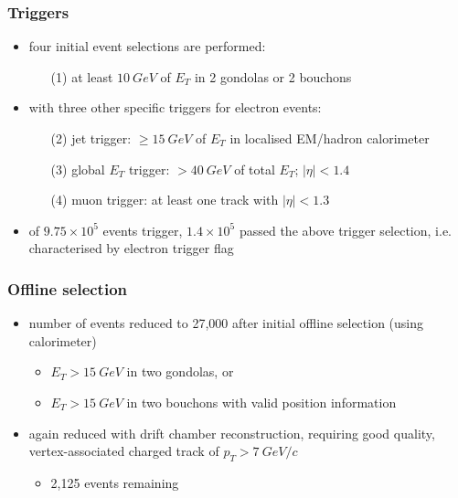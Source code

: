\documentclass[xcolor=table]{beamer}
\begin{document}
\begin{frame}
\frametitle{Triggers}
\fontsize{9pt}{12}\selectfont

\begin{itemize}
\item four initial event selections are performed:
\begin{enumerate}
\item[(1)] at least $\SI{10}{GeV}$ of $E_T$ in 2 gondolas or 2 bouchons
\end{enumerate}
\item with three other specific triggers for electron events:
\begin{enumerate}
\item[(2)] jet trigger: $\geq \SI{15}{GeV}$ of $E_T$ in localised EM/hadron calorimeter
\item[(3)] global $E_T$ trigger: $>\SI{40}{GeV}$ of total $E_T$; $|\eta|<1.4$
\item[(4)] muon trigger: at least one track with $|\eta|<1.3$
\end{enumerate}
\end{itemize}

\begin{itemize}
\item of $9.75\times 10^5$ events trigger, $1.4\times 10^5$ passed the above trigger selection, i.e. characterised by electron trigger flag
\end{itemize}


\end{frame}


\begin{frame}
\frametitle{Offline selection}
\fontsize{11pt}{12}\selectfont

\begin{itemize}
\item number of events reduced to 27,000 after initial offline selection (using calorimeter)
\begin{itemize}
\item $E_T> \SI{15}{GeV}$ in two gondolas, or
\item $E_T > \SI{15}{GeV}$ in two bouchons with valid position information
\end{itemize}
\item again reduced with drift chamber reconstruction, requiring good quality, vertex-associated charged track of $p_T>\SI{7}{GeV/c}$
\begin{itemize}
\item 2,125 events remaining
\end{itemize}
\end{itemize}



\end{frame}
\end{document}
